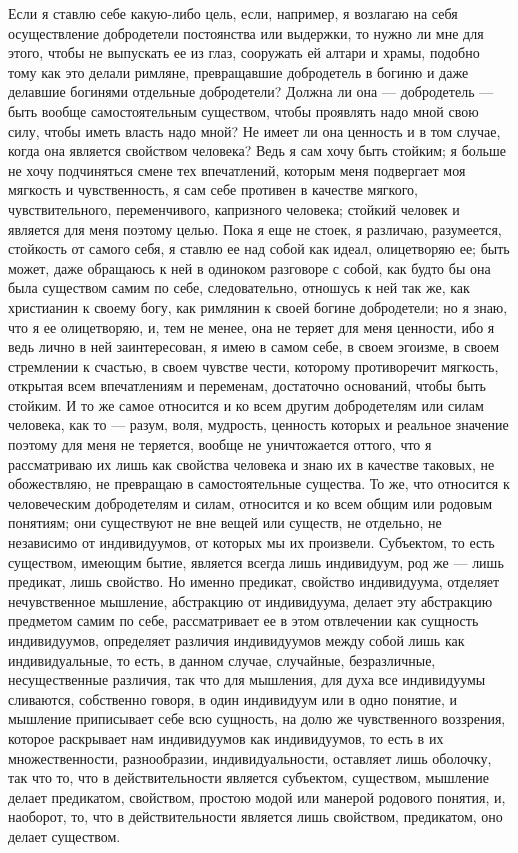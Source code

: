 \documentclass[12pt]{article}
\begin{document}
Если я ставлю себе какую-либо цель, если, например, я возлагаю на себя осуществление добродетели постоянства или выдержки, то нужно ли мне для этого, чтобы не выпускать ее из глаз, сооружать ей алтари и храмы, подобно тому как это делали римляне, превращавшие добродетель в богиню и даже делавшие богинями отдельные добродетели? Должна ли она --- добродетель --- быть вообще самостоятельным существом, чтобы проявлять надо мной свою силу, чтобы иметь власть надо мной? Не имеет ли она ценность и в том случае, когда она является свойством человека? Ведь я сам хочу быть стойким; я больше не хочу подчиняться смене тех впечатлений, которым меня подвергает моя мягкость и чувственность, я сам себе противен в качестве мягкого, чувствительного, переменчивого, капризного человека; стойкий человек и является для меня поэтому целью. Пока я еще не стоек, я различаю, разумеется, стойкость от самого себя, я ставлю ее над собой как идеал, олицетворяю ее; быть может, даже обращаюсь к ней в одиноком разговоре с собой, как будто бы она была существом самим по себе, следовательно, отношусь к ней так же, как христианин к своему богу, как римлянин к своей богине добродетели; но я знаю, что я ее олицетворяю, и, тем не менее, она не теряет для меня ценности, ибо я ведь лично в ней заинтересован, я имею в самом себе, в своем эгоизме, в своем стремлении к счастью, в своем чувстве чести, которому противоречит мягкость, открытая всем впечатлениям и переменам, достаточно оснований, чтобы быть стойким. И то же самое относится и ко всем другим добродетелям или силам человека, как то --- разум, воля, мудрость, ценность которых и реальное значение поэтому для меня не теряется, вообще не уничтожается оттого, что я рассматриваю их лишь как свойства человека и знаю их в качестве таковых, не обожествляю, не превращаю в самостоятельные существа. То же, что относится к человеческим добродетелям и силам, относится и ко всем общим или родовым понятиям; они существуют не вне вещей или существ, не отдельно, не независимо от индивидуумов, от которых мы их произвели. Субъектом, то есть существом, имеющим бытие, является всегда лишь индивидуум, род же --- лишь предикат, лишь свойство. Но именно предикат, свойство индивидуума, отделяет нечувственное мышление, абстракцию от индивидуума, делает эту абстракцию предметом самим по себе, рассматривает ее в этом отвлечении как сущность индивидуумов, определяет различия индивидуумов между собой лишь как индивидуальные, то есть, в данном случае, случайные, безразличные, несущественные различия, так что для мышления, для духа все индивидуумы сливаются, собственно говоря, в один индивидуум или в одно понятие, и мышление приписывает себе всю сущность, на долю же чувственного воззрения, которое раскрывает нам индивидуумов как индивидуумов, то есть в их множественности, разнообразии, индивидуальности, оставляет лишь оболочку, так что то, что в действительности является субъектом, существом, мышление делает предикатом, свойством, простою модой или манерой родового понятия, и, наоборот, то, что в действительности является лишь свойством, предикатом, оно делает существом. 
\end{document}
